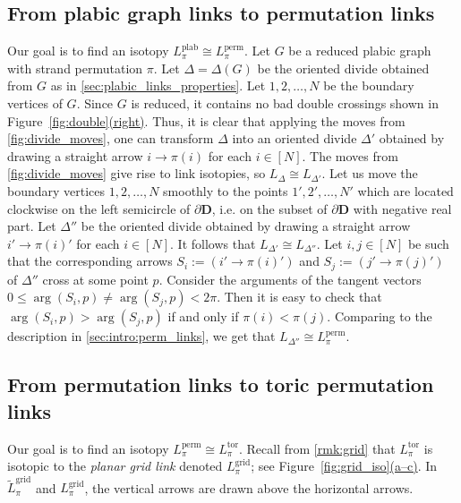 \documentclass[11pt]{article}
\theoremstyle{definition}
\numberwithin{equation}{section}
\newcommand\perm{\operatorname{perm}}
\newcommand\Lperm{L^{\perm}}
\newcommand\tor{\operatorname{tor}}
\newcommand\Ltor{L^{\tor}}
\newcommand\grid{\operatorname{grid}}
\newcommand\Lgrid{L^{\grid}}
\newcommand\Lgridt{\tilde L^{\grid}}
\newcommand\plab{\operatorname{plab}}
\newcommand\Lplab{L^{\plab}}
\newcommand\Arg{\operatorname{arg}}
\def\figref#1(#2){Figure~\hyperref[#1]{\ref*{#1}(#2)}}
\newcommand\n{N}
\newcommand\disk{\mathbf{D}}
\newcommand\Divide{\Delta}
\begin{document}
\subsection{From plabic graph links to permutation links}
Our goal is to find an isotopy $\Lplab_\pi\cong \Lperm_\pi$. Let $G$ be a reduced plabic graph with strand permutation $\pi$. Let $\Divide=\Divide(G)$ be the oriented divide obtained from $G$ as in \cref{sec:plabic_links_properties}. Let $1,2,\dots,\n$ be the boundary vertices of $G$. Since $G$ is reduced, it contains no bad double crossings shown in \figref{fig:double}(right). Thus, it is clear that applying the moves from \cref{fig:divide_moves}, one can transform $\Divide$ into an oriented divide $\Divide'$ obtained by drawing a straight arrow $i\to \pi(i)$ for each $i\in[\n]$. The moves from \cref{fig:divide_moves} give rise to link isotopies, so $L_\Divide\cong L_{\Divide'}$. Let us move the boundary vertices $1,2,\dots,\n$ smoothly to the points $1',2',\dots,\n'$ which are located clockwise on the left semicircle of $\partial \disk$, i.e.  on the subset of $\partial\disk$ with negative real part. Let $\Divide''$ be the oriented divide obtained by drawing a straight arrow $i'\to \pi(i)'$ for each $i\in[\n]$. It follows that $L_{\Divide'}\cong L_{\Divide''}$.
%
 Let $i,j\in[\n]$ be such that the corresponding arrows $S_i:=(i'\to \pi(i)')$ and $S_j:=(j'\to \pi(j)')$ of $\Divide''$ cross at some point $p$. Consider the arguments of the tangent vectors $0\leq \Arg(S_i,p)\neq\Arg(S_j,p)<2\pi$. Then it is easy to check that $\Arg(S_i,p)>\Arg(S_j,p)$ if and only if $\pi(i)<\pi(j)$. 
%
 Comparing to the description in \cref{sec:intro:perm_links}, we get that $L_{\Divide''}\cong\Lperm_\pi$.



\subsection{From permutation links to toric permutation links}\label{sec:perm-to-toric}
Our goal is to find an isotopy $\Lperm_\pi\cong\Ltor_\pi$. Recall from \cref{rmk:grid} that $\Ltor_\pi$ is isotopic to the \emph{planar grid link} denoted $\Lgrid_\pi$; see \figref{fig:grid_iso}(a--c). In $\Lgridt_\pi$ and $\Lgrid_\pi$, the vertical arrows are drawn above the horizontal arrows. 
\end{document}
